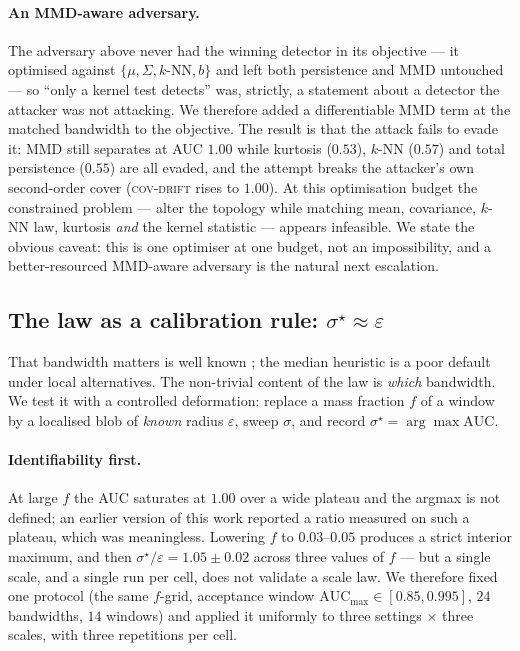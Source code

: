 \documentclass[11pt]{article}
\theoremstyle{remark}
\begin{document}
\paragraph{An MMD-aware adversary.} The adversary above never had the winning detector in its
objective --- it optimised against $\{\mu,\Sigma,k\text{-NN},b\}$ and left both persistence and MMD
untouched --- so ``only a kernel test detects'' was, strictly, a statement about a detector the
attacker was not attacking. We therefore added a differentiable MMD term at the matched bandwidth to
the objective. The result is that the attack fails to evade it: MMD still separates at AUC $1.00$
while kurtosis ($0.53$), $k$-NN ($0.57$) and total persistence ($0.55$) are all evaded, and the
attempt breaks the attacker's own second-order cover (\textsc{cov-drift} rises to $1.00$). At this
optimisation budget the constrained problem --- alter the topology while matching mean, covariance,
$k$-NN law, kurtosis \emph{and} the kernel statistic --- appears infeasible. We state the obvious
caveat: this is one optimiser at one budget, not an impossibility, and a better-resourced
MMD-aware adversary is the natural next escalation.

\subsection{The law as a calibration rule: $\sigma^\star\approx\varepsilon$}\label{sec:sigma}
That bandwidth matters is well known \citep{gretton2012kernel}; the median heuristic is a poor
default under local alternatives. The non-trivial content of the law is \emph{which} bandwidth. We
test it with a controlled deformation: replace a mass fraction $f$ of a window by a localised blob
of \emph{known} radius $\varepsilon$, sweep $\sigma$, and record
$\sigma^\star=\arg\max\mathrm{AUC}$.

\paragraph{Identifiability first.} At large $f$ the AUC saturates at $1.00$ over a wide plateau and
the argmax is not defined; an earlier version of this work reported a ratio measured on such a
plateau, which was meaningless. Lowering $f$ to $0.03$--$0.05$ produces a strict interior maximum,
and then
$\sigma^\star/\varepsilon=1.05\pm0.02$ across three values of $f$ --- but a single scale, and a
single run per cell, does not validate a scale law. We therefore fixed one protocol (the same
$f$-grid, acceptance window $\mathrm{AUC}_{\max}\in[0.85,0.995]$, $24$ bandwidths, $14$ windows) and
applied it uniformly to three settings $\times$ three scales, with three repetitions per cell.
\end{document}
